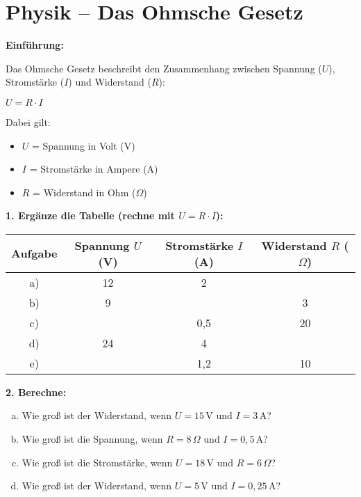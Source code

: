 \section*{Physik – Das Ohmsche Gesetz}

\textbf{Einführung:}

Das Ohmsche Gesetz beschreibt den Zusammenhang zwischen Spannung ($U$), Stromstärke ($I$) und Widerstand ($R$):

\begin{center}
$U = R \cdot I$
\end{center}

Dabei gilt:
\begin{itemize}
    \item $U$ = Spannung in Volt (V)
    \item $I$ = Stromstärke in Ampere (A)
    \item $R$ = Widerstand in Ohm ($\Omega$)
\end{itemize}

\vspace{0.5em}

\textbf{1. Ergänze die Tabelle (rechne mit $U = R \cdot I$):}

\begin{center}
\begin{tabular}{|c|c|c|c|}
\hline
Aufgabe & Spannung $U$ (V) & Stromstärke $I$ (A) & Widerstand $R$ ($\Omega$) \\
\hline
 a) & 12 & 2 & \\
 b) & 9 & & 3 \\
 c) & & 0{,}5 & 20 \\
 d) & 24 & 4 & \\
 e) & & 1{,}2 & 10 \\
\hline
\end{tabular}
\end{center}

\vspace{0.5em}

\textbf{2. Berechne:}
\begin{multicols}{2}
\begin{enumerate}[a)]
    \item Wie groß ist der Widerstand, wenn $U = 15\,\mathrm{V}$ und $I = 3\,\mathrm{A}$?
    \item Wie groß ist die Spannung, wenn $R = 8\,\Omega$ und $I = 0{,}5\,\mathrm{A}$?
    \item Wie groß ist die Stromstärke, wenn $U = 18\,\mathrm{V}$ und $R = 6\,\Omega$?
    \item Wie groß ist der Widerstand, wenn $U = 5\,\mathrm{V}$ und $I = 0{,}25\,\mathrm{A}$?
\end{enumerate}
\end{multicols}

